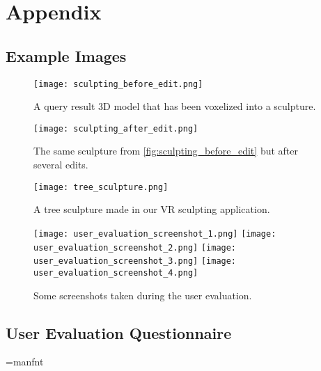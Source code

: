 \chapter{Appendix}

\section{Example Images}

\begin{figure}[!htb]
\texttt{[image: sculpting\_before\_edit.png]}
\caption{A query result 3D model that has been voxelized into a sculpture.}
\label{fig:sculpting_before_edit}
\endminipage\hfill
{}
\texttt{[image: sculpting\_after\_edit.png]}
\caption{The same sculpture from \ref{fig:sculpting_before_edit} but after several edits.}
\label{fig:sculpting_after_edit}
\endminipage\hfill
{}
\texttt{[image: tree\_sculpture.png]}
\caption{A tree sculpture made in our VR sculpting application.}
\label{fig:tree_sculpture}
\endminipage\hfill
\end{figure}

\begin{figure}[H]
	\centering
	\texttt{[image: user\_evaluation\_screenshot\_1.png]}
	\texttt{[image: user\_evaluation\_screenshot\_2.png]}
	\texttt{[image: user\_evaluation\_screenshot\_3.png]}
	\texttt{[image: user\_evaluation\_screenshot\_4.png]}
	\caption{Some screenshots taken during the user evaluation.}
	\label{fig:user_evaluation_screenshots}
\end{figure}

\newpage

\section{User Evaluation Questionnaire}

\ifx\pdfoutput\undefined
\else
    \pdfpagewidth=210mm
    \pdfpageheight=297mm
\fi

\newif\ifbanner\bannerfalse
\bannerfalse
\advance\oddsidemargin-5mm
\advance\textwidth1cm

\font\manual=manfnt
\def\shared{\noindent\llap{\manual\char'170\kern.15em}}

\def\heading#1{
    \ifhmode\par\fi
    \removelastskip
    \vskip1ex plus 0.5ex minus 0.3 ex%
    \noindent
    \hbox to \hsize{ #1\hfill}
    \smallskip\par\nobreak}


